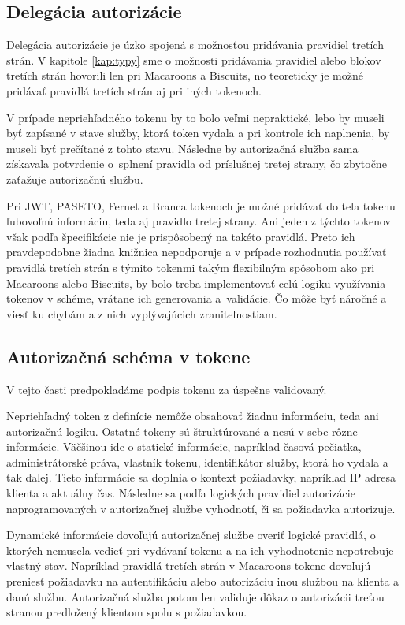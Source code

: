 \subsection{Delegácia autorizácie}

Delegácia autorizácie je úzko spojená s možnosťou pridávania pravidiel tretích strán. V kapitole \ref{kap:typy} sme o možnosti pridávania pravidiel alebo blokov tretích strán hovorili len pri Macaroons a Biscuits, no teoreticky je možné pridávať pravidlá tretích strán aj pri iných tokenoch. 

V prípade nepriehľadného tokenu by to bolo veľmi nepraktické, lebo by museli byť zapísané v stave služby, ktorá token vydala a pri kontrole ich naplnenia, by museli byť prečítané z tohto stavu. Následne by autorizačná služba sama získavala potvrdenie o~splnení pravidla od príslušnej tretej strany, čo zbytočne zaťažuje autorizačnú službu.

Pri JWT, PASETO, Fernet a Branca tokenoch je možné pridávať do tela tokenu ľubovoľnú informáciu, teda aj pravidlo tretej strany. Ani jeden z týchto tokenov však podľa špecifikácie nie je prispôsobený na takéto pravidlá. Preto ich pravdepodobne žiadna knižnica nepodporuje a v prípade rozhodnutia používať pravidlá tretích strán s týmito tokenmi takým flexibilným spôsobom ako pri Macaroons alebo Biscuits, by bolo treba implementovať celú logiku využívania tokenov v schéme, vrátane ich generovania a~validácie. Čo môže byť náročné a viesť ku chybám a z nich vyplývajúcich zraniteľnostiam.

\subsection{Autorizačná schéma v tokene}

V tejto časti predpokladáme podpis tokenu za úspešne validovaný.

Nepriehľadný token z definície nemôže obsahovať žiadnu informáciu, teda ani autorizačnú logiku. Ostatné tokeny sú štruktúrované a nesú v sebe rôzne informácie. Väčšinou ide o statické informácie, napríklad časová pečiatka, administrátorské práva, vlastník tokenu, identifikátor služby, ktorá ho vydala a tak ďalej. Tieto informácie sa doplnia o kontext požiadavky, napríklad IP adresa klienta a aktuálny čas. Následne sa podľa logických pravidiel autorizácie naprogramovaných v autorizačnej službe vyhodnotí, či sa požiadavka autorizuje.

Dynamické informácie dovoľujú autorizačnej službe overiť logické pravidlá, o ktorých nemusela vedieť pri vydávaní tokenu a na ich vyhodnotenie nepotrebuje vlastný stav. Napríklad pravidlá tretích strán v Macaroons tokene dovoľujú preniesť požiadavku na autentifikáciu alebo autorizáciu inou službou na klienta a danú službu. Autorizačná služba potom len validuje dôkaz o autorizácii treťou stranou predložený klientom spolu s požiadavkou.

